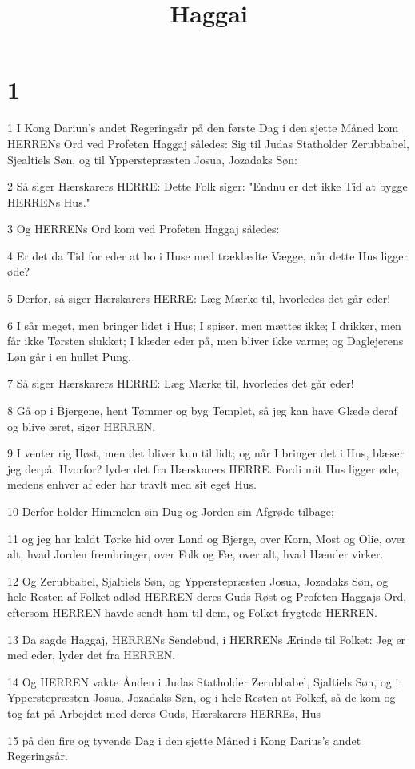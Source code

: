 

\title{Haggai}


\chapter{1}

\par 1 I Kong Dariun's andet Regeringsår på den første Dag i den sjette Måned kom HERRENs Ord ved Profeten Haggaj således: Sig til Judas Statholder Zerubbabel, Sjealtiels Søn, og til Ypperstepræsten Josua, Jozadaks Søn:
\par 2 Så siger Hærskarers HERRE: Dette Folk siger: "Endnu er det ikke Tid at bygge HERRENs Hus."
\par 3 Og HERRENs Ord kom ved Profeten Haggaj således:
\par 4 Er det da Tid for eder at bo i Huse med træklædte Vægge, når dette Hus ligger øde?
\par 5 Derfor, så siger Hærskarers HERRE: Læg Mærke til, hvorledes det går eder!
\par 6 I sår meget, men bringer lidet i Hus; I spiser, men mættes ikke; I drikker, men får ikke Tørsten slukket; I klæder eder på, men bliver ikke varme; og Daglejerens Løn går i en hullet Pung.
\par 7 Så siger Hærskarers HERRE: Læg Mærke til, hvorledes det går eder!
\par 8 Gå op i Bjergene, hent Tømmer og byg Templet, så jeg kan have Glæde deraf og blive æret, siger HERREN.
\par 9 I venter rig Høst, men det bliver kun til lidt; og når I bringer det i Hus, blæser jeg derpå. Hvorfor? lyder det fra Hærskarers HERRE. Fordi mit Hus ligger øde, medens enhver af eder har travlt med sit eget Hus.
\par 10 Derfor holder Himmelen sin Dug og Jorden sin Afgrøde tilbage;
\par 11 og jeg har kaldt Tørke hid over Land og Bjerge, over Korn, Most og Olie, over alt, hvad Jorden frembringer, over Folk og Fæ, over alt, hvad Hænder virker.
\par 12 Og Zerubbabel, Sjaltiels Søn, og Ypperstepræsten Josua, Jozadaks Søn, og hele Resten af Folket adlød HERREN deres Guds Røst og Profeten Haggajs Ord, eftersom HERREN havde sendt ham til dem, og Folket frygtede HERREN.
\par 13 Da sagde Haggaj, HERRENs Sendebud, i HERRENs Ærinde til Folket: Jeg er med eder, lyder det fra HERREN.
\par 14 Og HERREN vakte Ånden i Judas Statholder Zerubbabel, Sjaltiels Søn, og i Ypperstepræsten Josua, Jozadaks Søn, og i hele Resten at Folkef, så de kom og tog fat på Arbejdet med deres Guds, Hærskarers HERREs, Hus
\par 15 på den fire og tyvende Dag i den sjette Måned i Kong Darius's andet Regeringsår.

